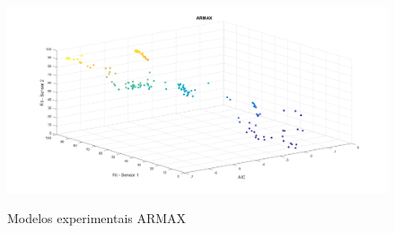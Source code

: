 \begin{figure}[h]
	\caption{Modelos experimentais ARMAX}
	\begin{center}
		\includegraphics[width=1.00\textwidth]{./5_images/tclabsp-models-ARMAX.png} 
		\label{fig:tclabsp-models-armax}
	\end{center}
	\centering
\end{figure}

